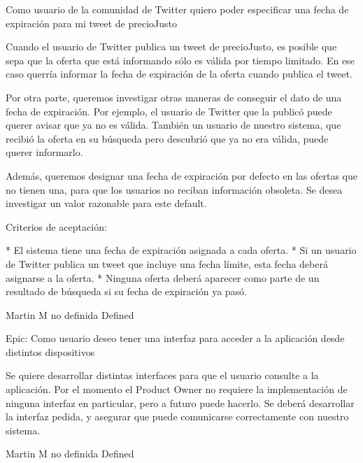 	{Como usuario de la comunidad de Twitter quiero poder especificar una fecha de expiración para mi tweet de precioJusto} %
	{Cuando el usuario de Twitter publica un tweet de precioJusto, es posible que
sepa que la oferta que está informando sólo es válida por tiempo limitado. En
ese caso querría informar la fecha de expiración de la oferta cuando publica
el tweet.

Por otra parte, queremos investigar otras maneras de conseguir el dato de una
fecha de expiración. Por ejemplo, el usuario de Twitter que la publicó puede
querer avisar que ya no es válida. También un usuario de nuestro sistema, que
recibió la oferta en su búsqueda pero descubrió que ya no era válida, puede
querer informarlo.

  
Además, queremos designar una fecha de expiración por defecto en las ofertas
que no tienen una, para que los usuarios no reciban información obsoleta. Se
desea investigar un valor razonable para este default.

  
Criterios de aceptación:

* El sistema tiene una fecha de expiración asignada a cada oferta.  
* Si un usuario de Twitter publica un tweet que incluye una fecha límite, esta fecha deberá asignarse a la oferta.  
* Ninguna oferta deberá aparecer como parte de un resultado de búsqueda si su fecha de expiración ya pasó.

} %
	{} %
	{} %
	{Martin M} %
	{no definida} %
	{Defined} %


\vspace{20pt}

	{Epic: Como usuario deseo tener una interfaz para acceder a la aplicación desde distintos dispositivos} %
	{Se quiere desarrollar distintas interfaces para que el usuario consulte a la
aplicación. Por el momento el Product Owner no requiere la implementación de
ninguna interfaz en particular, pero a futuro puede hacerlo. Se deberá
desarrollar la interfaz pedida, y asegurar que puede comunicarse correctamente
con nuestro sistema.

} %
	{} %
	{} %
	{Martin M} %
	{no definida} %
	{Defined} %


\vspace{20pt}

